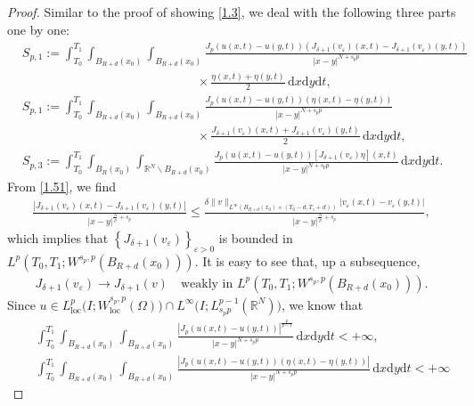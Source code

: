 \documentclass[reqno,10pt]{amsart}
\numberwithin{equation}{section}
\begin{document}
\begin{proof}
	Similar to the proof of showing \eqref{1.3}, we deal with the following three parts one by one:
	\begin{align*}
		&S_{p,1}:=\int_{T_0}^{T_1}\int_{B_{R+d}(x_0)}\int_{B_{R+d}(x_0)}\frac{J_p\left( u(x,t)-u(y,t)\right)\left( J_{\delta+1}(v_\varepsilon)(x,t)-J_{\delta+1}(v_\varepsilon)(y,t)\right)}{|x-y|^{N+s_pp}}\\
		&\qquad\qquad\qquad\qquad\qquad\qquad\qquad\times\frac{\eta(x,t)+\eta(y,t)}{2}\,\mathrm{d}x\mathrm{d}y\mathrm{d}t,\\
		&S_{p,1}:=\int_{T_0}^{T_1}\int_{B_{R+d}(x_0)}\int_{B_{R+d}(x_0)}\frac{J_p\left( u(x,t)-u(y,t)\right)\left( \eta(x,t)-\eta(y,t)\right)}{|x-y|^{N+s_pp}}\\
		&\qquad\qquad\qquad\qquad\qquad\qquad\qquad\times\frac{J_{\delta+1}(v_\varepsilon)(x,t)+J_{\delta+1}(v_\varepsilon)(y,t)}{2}\,\mathrm{d}x\mathrm{d}y\mathrm{d}t,\\
		&S_{p,3}:=\int_{T_0}^{T_1}\int_{B_{R}(x_0)}\int_{\mathbb{R}^N\backslash B_{R+d}(x_0)}\frac{J_p\left( u(x,t)-u(y,t)\right)\left[ J_{\delta+1}(v_\varepsilon)\eta\right](x,t)}{|x-y|^{N+s_pp}}\,\mathrm{d}x\mathrm{d}y\mathrm{d}t.
	\end{align*}
	From \eqref{1.51}, we find
	\begin{align*}
		\frac{\left| J_{\delta+1}(v_\varepsilon)(x,t)-J_{\delta+1}(v_\varepsilon)(y,t)\right| }{|x-y|^{\frac{N}{p}+s_p}}\le \frac{\delta\|v\|_{L^\infty\left( B_{R+d}(x_0)\times(T_0-d,T_1+d)\right)}\left|v_\varepsilon(x,t)-v_\varepsilon(y,t)\right| }{|x-y|^{\frac{N}{p}+s_p}},
	\end{align*}
	which implies that $\left\lbrace J_{\delta+1}(v_\varepsilon)\right\rbrace_{\varepsilon>0} $ is bounded in $L^p\left( T_0,T_1;W^{s_p,p}(B_{R+d}(x_0))\right)$. It is easy to see that, up a subsequence,
	\begin{align}
		\label{1.7}
		J_{\delta+1}(v_\varepsilon)\rightarrow J_{\delta+1}(v)\quad\text{weakly in }L^p\left( T_0,T_1;W^{s_p,p}(B_{R+d}(x_0))\right). 
	\end{align}
	Since $u\in L^p_\mathrm{loc}\bigl(I;W^{s_p,p}_\mathrm{loc}(\Omega)\bigl)\cap L^\infty\bigl(I;L^{p-1}_{s_pp}(\mathbb{R}^N)\bigl)$, we know that
	\begin{align*}
			&\quad\int_{T_0}^{T_1}\int_{B_{R+d}(x_0)}\int_{B_{R+d}(x_0)}\frac{\left| J_p\left(u(x,t)-u(y,t)\right)\right|^{\frac{p}{p-1}}}{|x-y|^{N+s_pp}}\,\mathrm{d}x\mathrm{d}y\mathrm{d}t<+\infty,\\
			&\quad\int_{T_0}^{T_1}\int_{B_{R+d}(x_0)}\int_{B_{R+d}(x_0)}\frac{\left| J_p\left(u(x,t)-u(y,t)\right)(\eta(x,t)-\eta(y,t))\right|}{|x-y|^{N+s_pp}}\,\mathrm{d}x\mathrm{d}y\mathrm{d}t<+\infty

\end{align*}
\end{proof}
\end{document}
